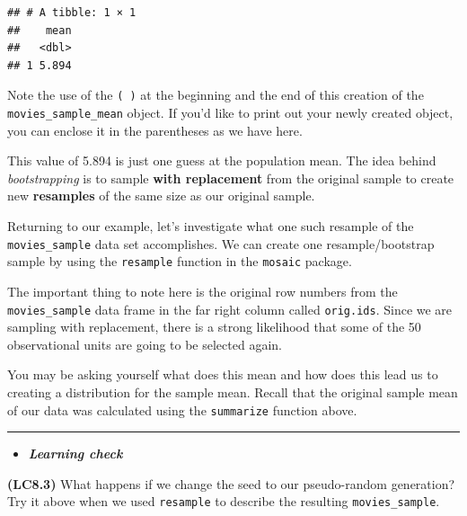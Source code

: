 \documentclass[]{tufte-book}
\newenvironment{Shaded}{\begin{snugshade}}{\end{snugshade}}
\newcommand{\KeywordTok}[1]{\textcolor[rgb]{0.13,0.29,0.53}{\textbf{{#1}}}}
\newcommand{\StringTok}[1]{\textcolor[rgb]{0.31,0.60,0.02}{{#1}}}
\newcommand{\NormalTok}[1]{{#1}}
\let\oldrule=\rule
\renewcommand{\rule}[1]{\oldrule{\linewidth}}
\newenvironment{rmdblock}[1]
  {\begin{shaded*}
  \begin{itemize}
  \renewcommand{\labelitemi}{
    \raisebox{-.7\height}[0pt][0pt]{
    }
  }
  \item
  }
  {
  \end{itemize}
  \end{shaded*}
  }
\newenvironment{learncheck}
  {\begin{rmdblock}{warning}}
  {\end{rmdblock}}
\theoremstyle{definition}
\theoremstyle{definition}
\theoremstyle{remark}
\begin{document}
\begin{verbatim}
## # A tibble: 1 × 1
##    mean
##   <dbl>
## 1 5.894
\end{verbatim}

Note the use of the \texttt{(\ )} at the beginning and the end of this
creation of the \texttt{movies\_sample\_mean} object. If you'd like to
print out your newly created object, you can enclose it in the
parentheses as we have here.

This value of 5.894 is just one guess at the population mean. The idea
behind \emph{bootstrapping} is to sample \textbf{with replacement} from
the original sample to create new \textbf{resamples} of the same size as
our original sample.

Returning to our example, let's investigate what one such resample of
the \texttt{movies\_sample} data set accomplishes. We can create one
resample/bootstrap sample by using the \texttt{resample} function in the
\texttt{mosaic} package.

\begin{Shaded}
\end{Shaded}

The important thing to note here is the original row numbers from the
\texttt{movies\_sample} data frame in the far right column called
\texttt{orig.ids}. Since we are sampling with replacement, there is a
strong likelihood that some of the 50 observational units are going to
be selected again.

You may be asking yourself what does this mean and how does this lead us
to creating a distribution for the sample mean. Recall that the original
sample mean of our data was calculated using the \texttt{summarize}
function above.

\begin{center}\rule{0.5\linewidth}{\linethickness}\end{center}

\begin{learncheck}
\textbf{\emph{Learning check}}
\end{learncheck}

\textbf{(LC8.3)} What happens if we change the seed to our pseudo-random
generation? Try it above when we used \texttt{resample} to describe the
resulting \texttt{movies\_sample}.
\end{document}
